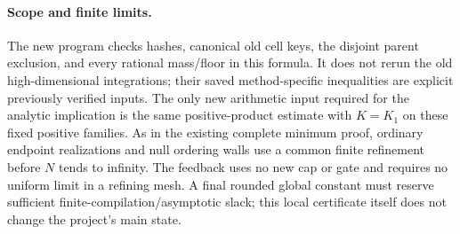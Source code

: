 \paragraph{Scope and finite limits.}
The new program checks hashes, canonical old cell keys, the disjoint
parent exclusion, and every rational mass/floor in this formula.  It
does not rerun the old high-dimensional integrations; their saved
method-specific inequalities are explicit previously verified inputs.
The only new arithmetic input required for the analytic implication is
the same positive-product estimate with $K=K_1$ on these fixed positive
families.  As in the existing complete minimum proof, ordinary endpoint
realizations and null ordering walls use a common finite refinement
before $N$ tends to infinity.  The feedback uses no new cap or gate and
requires no uniform limit in a refining mesh.  A final rounded global
constant must reserve sufficient finite-compilation/asymptotic slack;
this local certificate itself does not change the project's main state.
